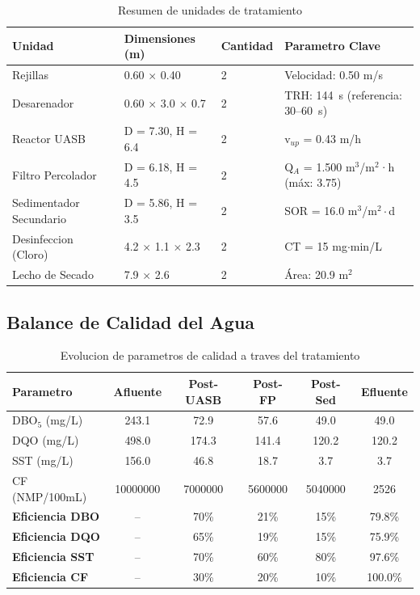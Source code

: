 \documentclass[12pt,a4paper]{article}
\begin{document}
\begin{table}[H]
\centering
\caption{Resumen de unidades de tratamiento}
\small
\begin{tabular}{p{3.2cm}p{3.5cm}p{1.5cm}p{4.8cm}}
\toprule
\textbf{Unidad} & \textbf{Dimensiones (m)} & \textbf{Cantidad} & \textbf{Parametro Clave} \\
\midrule
Rejillas & 0.60 $\times$ 0.40 & 2 & Velocidad: 0.50 m/s \\
Desarenador & 0.60 $\times$ 3.0 $\times$ 0.7 & 2 & TRH: 144~s (referencia: 30--60~s) \\
Reactor UASB & D = 7.30, H = 6.4 & 2 & v$_{up}$ = 0.43 m/h \\
Filtro Percolador & D = 6.18, H = 4.5 & 2 & Q$_A$ = 1.500 m$^3$/m$^2$·h (máx: 3.75) \\
Sedimentador Secundario & D = 5.86, H = 3.5 & 2 & SOR = 16.0 m$^3$/m$^2\cdot$d \\
Desinfeccion (Cloro) & 4.2 $\times$ 1.1 $\times$ 2.3 & 2 & CT = 15 mg$\cdot$min/L \\
Lecho de Secado & 7.9 $\times$ 2.6 & 2 & Área: 20.9 m$^2$ \\
\bottomrule
\end{tabular}
\end{table}

\subsection{Balance de Calidad del Agua}

\begin{table}[H]
\centering
\caption{Evolucion de parametros de calidad a traves del tratamiento}
\begin{tabular}{lccccc}
\toprule
\textbf{Parametro} & \textbf{Afluente} & \textbf{Post-UASB} & \textbf{Post-FP} & \textbf{Post-Sed} & \textbf{Efluente} \\
\midrule
DBO$_5$ (mg/L) & 243.1 & 72.9 & 57.6 & 49.0 & 49.0 \\
DQO (mg/L) & 498.0 & 174.3 & 141.4 & 120.2 & 120.2 \\
SST (mg/L) & 156.0 & 46.8 & 18.7 & 3.7 & 3.7 \\
CF (NMP/100mL) & 10000000 & 7000000 & 5600000 & 5040000 & 2526 \\
\midrule
\textbf{Eficiencia DBO} & -- & 70\% & 21\% & 15\% & 79.8\% \\
\textbf{Eficiencia DQO} & -- & 65\% & 19\% & 15\% & 75.9\% \\
\textbf{Eficiencia SST} & -- & 70\% & 60\% & 80\% & 97.6\% \\
\textbf{Eficiencia CF} & -- & 30\% & 20\% & 10\% & 100.0\% \\
\bottomrule
\end{tabular}
\end{table}
\end{document}
